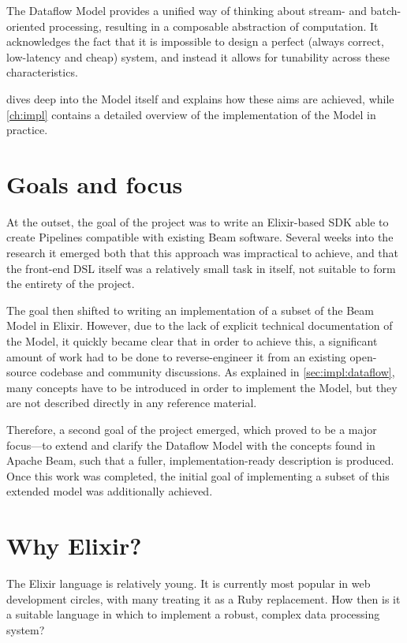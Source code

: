 The Dataflow Model provides a unified way of thinking about stream- and batch-oriented processing, resulting in a composable abstraction of computation.
It acknowledges the fact that it is impossible to design a perfect (always correct, low-latency and cheap) system, and instead it allows for tunability across these characteristics.

 dives deep into the Model itself and explains how these aims are achieved, while \cref{ch:impl} contains a detailed overview of the implementation of the Model in practice.

\section{Goals and focus}\label{sec:intro:goals}

At the outset, the goal of the project was to write an Elixir-based SDK able to create Pipelines compatible with existing Beam software.
Several weeks into the research it emerged both that this approach was impractical to achieve, and that the front-end DSL itself was a relatively small task in itself, not suitable to form the entirety of the project.

The goal then shifted to writing an implementation of a subset of the Beam Model in Elixir.
However, due to the lack of explicit technical documentation of the Model, it quickly became clear that in order to achieve this, a significant amount of work had to be done to reverse-engineer it from an existing open-source codebase and community discussions.
As explained in \cref{sec:impl:dataflow}, many concepts have to be introduced in order to implement the Model, but they are not described directly in any reference material.

Therefore, a second goal of the project emerged, which proved to be a major focus---to extend and clarify the Dataflow Model with the concepts found in Apache Beam, such that a fuller, implementation-ready description is produced.
Once this work was completed, the initial goal of implementing a subset of this extended model was additionally achieved.

\section{Why Elixir?}\label{sec:intro:elixir}

The Elixir language \cite{Elixir} is relatively young.
It is currently most popular in web development circles, with many treating it as a Ruby replacement.
How then is it a suitable language in which to implement a robust, complex data processing system?

